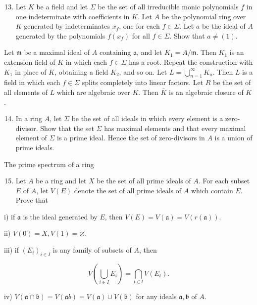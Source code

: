 \documentclass{standalone}
\theoremstyle{definition}
\theoremstyle{remark}
\begin{document}
\begin{enumerate}
  \setcounter{enumi}{12}
  \item Let $K$ be a field and let $\Sigma$ be the set of all irreducible monic polynomials $f$ in one indeterminate with coefficients in $K$. Let $A$ be the polynomial ring over $K$ generated by indeterminates $x_{f}$, one for each $f \in \Sigma$. Let $a$ be the ideal of $A$ generated by the polynomials $f\left(x_{f}\right)$ for all $f \in \Sigma$. Show that $a \neq(1)$.
\end{enumerate}

Let $\mathfrak{m}$ be a maximal ideal of $A$ containing $\mathfrak{a}$, and let $K_{1}=A / \mathfrak{m}$. Then $K_{1}$ is an extension field of $K$ in which each $f \in \Sigma$ has a root. Repeat the construction with $K_{1}$ in place of $K$, obtaining a field $K_{2}$, and so on. Let $L=\bigcup_{n=1}^{\infty} K_{n}$. Then $L$ is a field in which each $f \in \Sigma$ splits completely into linear factors. Let $R$ be the set of all elements of $L$ which are algebraic over $K$. Then $\bar{K}$ is an algebraic closure of $K$.

\begin{enumerate}
  \setcounter{enumi}{13}
  \item In a ring $A$, let $\Sigma$ be the set of all ideals in which every element is a zero-divisor. Show that the set $\Sigma$ has maximal elements and that every maximal element of $\Sigma$ is a prime ideal. Hence the set of zero-divisors in $A$ is a union of prime ideals.
\end{enumerate}

The prime spectrum of a ring

\begin{enumerate}
  \setcounter{enumi}{14}
  \item Let $A$ be a ring and let $X$ be the set of all prime ideals of $A$. For each subset $E$ of $A$, let $V(E)$ denote the set of all prime ideals of $A$ which contain $E$. Prove that
\end{enumerate}

i) if $\mathfrak{a}$ is the ideal generated by $E$, then $V(E)=V(\mathfrak{a})=V(r(\mathfrak{a}))$.

ii) $V(0)=X, V(1)=\varnothing$.

iii) if $\left(E_{i}\right)_{i \in I}$ is any family of subsets of $A$, then

\[
V\left(\bigcup_{i \in I} E_{i}\right)=\bigcap_{t \in l} V\left(E_{t}\right) .
\]

iv) $V(\mathfrak{a} \cap \mathfrak{b})=V(\mathfrak{a} b)=V(\mathfrak{a}) \cup V(\mathfrak{b})$ for any ideals $\mathfrak{a}, \mathfrak{b}$ of $A$.
\end{document}
